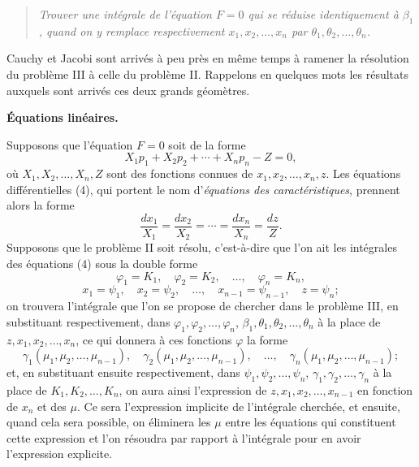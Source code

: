 \documentclass[11pt]{article}
\begin{document}
\begin{quote}\itshape
Trouver une intégrale de l'équation $F=0$ qui se réduise identiquement à $\beta_1$, quand on y remplace respectivement $x_1,x_2,\ldots,x_n$ par $\theta_1,\theta_2,\ldots,\theta_n$.
\end{quote}

Cauchy et Jacobi sont arrivés à peu près en même temps à ramener la résolution du problème III à celle du problème II. Rappelons en quelques mots les résultats auxquels sont arrivés ces deux grands géomètres.

\begin{center}
\textbf{Équations linéaires.}
\end{center}

Supposons que l'équation $F=0$ soit de la forme
\[
X_1p_1+X_2p_2+\cdots+X_np_n-Z=0,
\]
où $X_1,X_2,\ldots,X_n,Z$ sont des fonctions connues de $x_1,x_2,\ldots,x_n,z$. Les équations différentielles (4), qui portent le nom d'\emph{équations des caractéristiques}, prennent alors la forme
\begin{equation*}\tag{4}
\frac{dx_1}{X_1}=\frac{dx_2}{X_2}=\cdots=\frac{dx_n}{X_n}=\frac{dz}{Z}.
\end{equation*}
Supposons que le problème II soit résolu, c'est-à-dire que l'on ait les intégrales des équations (4) sous la double forme
\begin{equation*}\tag{5}
\varphi_1=K_1,
\quad \varphi_2=K_2,
\quad \ldots,
\quad \varphi_n=K_n,
\end{equation*}
\begin{equation*}\tag{6}
x_1=\psi_1,
\quad x_2=\psi_2,
\quad \ldots,
\quad x_{n-1}=\psi_{n-1},
\quad z=\psi_n;
\end{equation*}
on trouvera l'intégrale que l'on se propose de chercher dans le problème III, en substituant respectivement, dans $\varphi_1,\varphi_2,\ldots,\varphi_n$, $\beta_1,\theta_1,\theta_2,\ldots,\theta_n$ à la place de $z,x_1,x_2,\ldots,x_n$, ce qui donnera à ces fonctions $\varphi$ la forme
\[
\gamma_1(\mu_1,\mu_2,\ldots,\mu_{n-1}),
\quad
\gamma_2(\mu_1,\mu_2,\ldots,\mu_{n-1}),
\quad \ldots,
\quad
\gamma_n(\mu_1,\mu_2,\ldots,\mu_{n-1});
\]
et, en substituant ensuite respectivement, dans $\psi_1,\psi_2,\ldots,\psi_n$, $\gamma_1,\gamma_2,\ldots,\gamma_n$ à la place de $K_1,K_2,\ldots,K_n$, on aura ainsi l'expression de $z,x_1,x_2,\ldots,x_{n-1}$ en fonction de $x_n$ et des $\mu$. Ce sera l'expression implicite de l'intégrale cherchée, et ensuite, quand cela sera possible, on éliminera les $\mu$ entre les équations qui constituent cette expression et l'on résoudra par rapport à l'intégrale pour en avoir l'expression explicite.
\end{document}
